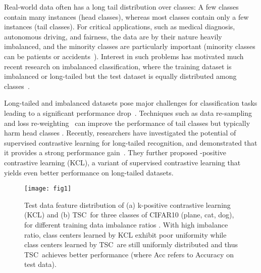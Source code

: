 \documentclass[10pt,twocolumn,letterpaper]{article}
\newcommand{\name} {TSC}
\begin{document}
Real-world data often has a long tail distribution over classes: A few classes contain many instances (head classes), whereas most classes contain only a few instances (tail classes). For critical applications, such as medical diagnosis, autonomous driving, and fairness, the data are by their nature heavily imbalanced, and the minority classes are particularly important (minority classes can be patients or accidents~\cite{shen2015long,yang2022multi,yang2021delving}). Interest in such problems has motivated much recent research on imbalanced classification, where the training dataset is imbalanced or long-tailed but the test dataset is equally distributed among classes~\cite{kang2019decoupling,wang2020long,yang2020rethinking,cao2019learning,yang2022multi}. 

Long-tailed and imbalanced datasets pose major challenges for classification tasks leading to a significant performance drop~\cite{ando2017deep, buda2018systematic, collobert2008unified, yang2019me, wu2020solving}. Techniques such as data re-sampling~\cite{chawla2002smote, shen2016relay, buda2018systematic, ando2017deep} and  loss re-weighting~\cite{cao2019learning, cui2019class, dong2018imbalanced, khan2019striking, khan2017cost, byrd2019effect} can improve the performance of tail classes but typically harm head classes \cite{kang2019decoupling}.
Recently, researchers have investigated the potential of supervised contrastive learning for long-tailed recognition, and demonstrated that it provides a strong performance gain~\cite{kang2020exploring}. They further proposed -positive contrastive learning (KCL), a variant of supervised contrastive learning that yields even better performance on long-tailed datasets.


\begin{figure}[t]
\begin{center}
\texttt{[image: fig1]} 
\end{center}
\vspace{-10pt}
\caption{\small
Test data feature distribution of (a) k-positive contrastive learning (KCL) and (b) \name\ for three classes of CIFAR10 (plane, cat, dog), for different training data imbalance ratios . With high imbalance ratio, class centers learned by KCL exhibit poor uniformity while class centers learned by \name~are still uniformly distributed and thus \name\ achieves better performance (where Acc refers to Accuracy on test data).}
\label{fig:intro}
\vspace{-10pt}
\end{figure}
\end{document}
